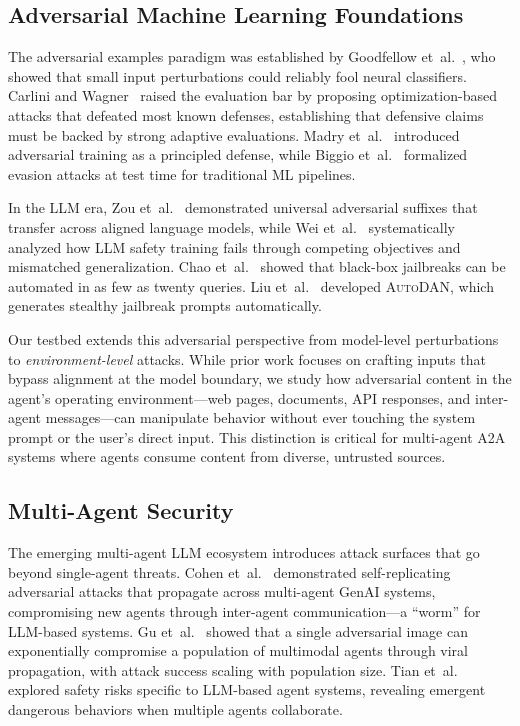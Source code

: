 \subsection{Adversarial Machine Learning Foundations}
\label{sec:rw-adversarial}

The adversarial examples paradigm was established by
Goodfellow et~al.~\cite{goodfellow2015adversarial}, who showed that
small input perturbations could reliably fool neural classifiers.
Carlini and Wagner~\cite{carlini2017evaluating} raised the
evaluation bar by proposing optimization-based attacks that
defeated most known defenses, establishing that defensive
claims must be backed by strong adaptive evaluations.
Madry et~al.~\cite{madry2018towards} introduced adversarial
training as a principled defense, while
Biggio et~al.~\cite{biggio2013evasion} formalized evasion attacks
at test time for traditional ML pipelines.

In the LLM era, Zou et~al.~\cite{zou2023universal} demonstrated
universal adversarial suffixes that transfer across aligned language
models, while Wei et~al.~\cite{wei2024jailbroken} systematically
analyzed how LLM safety training fails through competing
objectives and mismatched generalization.
Chao et~al.~\cite{chao2023jailbreaking} showed that black-box
jailbreaks can be automated in as few as twenty queries.
Liu et~al.~\cite{liu2024autodan} developed \textsc{AutoDAN}, which
generates stealthy jailbreak prompts automatically.

Our testbed extends this adversarial perspective from model-level
perturbations to \emph{environment-level} attacks.  While prior work
focuses on crafting inputs that bypass alignment at the model
boundary, we study how adversarial content in the agent's operating
environment---web pages, documents, API responses, and inter-agent
messages---can manipulate behavior without ever touching the system
prompt or the user's direct input.  This distinction is critical
for multi-agent A2A systems where agents consume content from
diverse, untrusted sources.

\subsection{Multi-Agent Security}
\label{sec:rw-multiagent}

The emerging multi-agent LLM ecosystem introduces attack surfaces
that go beyond single-agent threats.  Cohen et~al.~\cite{cohen2024unleashing}
demonstrated self-replicating adversarial attacks that propagate
across multi-agent GenAI systems, compromising new agents through
inter-agent communication---a ``worm'' for LLM-based systems.
Gu et~al.~\cite{gu2024agent} showed that a single adversarial
image can exponentially compromise a population of multimodal
agents through viral propagation, with attack success scaling
with population size.
Tian et~al.~\cite{tian2024evil} explored safety risks specific
to LLM-based agent systems, revealing emergent dangerous behaviors
when multiple agents collaborate.

